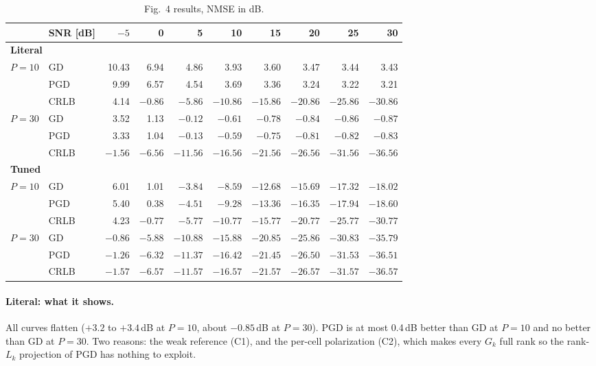 \documentclass[11pt,a4paper]{article}
\begin{document}
\begin{table}[h!]
\centering
\footnotesize
\caption{Fig.~4 results, NMSE in dB.}
\label{tab:fig4res}
\begin{tabular}{llrrrrrrrr}
\toprule
& SNR [dB] & $-5$ & 0 & 5 & 10 & 15 & 20 & 25 & 30 \\
\midrule
\multicolumn{10}{l}{\textbf{Literal}} \\
$P=10$ & GD   & 10.43 & 6.94 & 4.86 & 3.93 & 3.60 & 3.47 & 3.44 & 3.43 \\
       & PGD  & 9.99 & 6.57 & 4.54 & 3.69 & 3.36 & 3.24 & 3.22 & 3.21 \\
       & CRLB & 4.14 & $-0.86$ & $-5.86$ & $-10.86$ & $-15.86$ & $-20.86$ & $-25.86$ & $-30.86$ \\
$P=30$ & GD   & 3.52 & 1.13 & $-0.12$ & $-0.61$ & $-0.78$ & $-0.84$ & $-0.86$ & $-0.87$ \\
       & PGD  & 3.33 & 1.04 & $-0.13$ & $-0.59$ & $-0.75$ & $-0.81$ & $-0.82$ & $-0.83$ \\
       & CRLB & $-1.56$ & $-6.56$ & $-11.56$ & $-16.56$ & $-21.56$ & $-26.56$ & $-31.56$ & $-36.56$ \\
\midrule
\multicolumn{10}{l}{\textbf{Tuned}} \\
$P=10$ & GD   & 6.01 & 1.01 & $-3.84$ & $-8.59$ & $-12.68$ & $-15.69$ & $-17.32$ & $-18.02$ \\
       & PGD  & 5.40 & 0.38 & $-4.51$ & $-9.28$ & $-13.36$ & $-16.35$ & $-17.94$ & $-18.60$ \\
       & CRLB & 4.23 & $-0.77$ & $-5.77$ & $-10.77$ & $-15.77$ & $-20.77$ & $-25.77$ & $-30.77$ \\
$P=30$ & GD   & $-0.86$ & $-5.88$ & $-10.88$ & $-15.88$ & $-20.85$ & $-25.86$ & $-30.83$ & $-35.79$ \\
       & PGD  & $-1.26$ & $-6.32$ & $-11.37$ & $-16.42$ & $-21.45$ & $-26.50$ & $-31.53$ & $-36.51$ \\
       & CRLB & $-1.57$ & $-6.57$ & $-11.57$ & $-16.57$ & $-21.57$ & $-26.57$ & $-31.57$ & $-36.57$ \\
\bottomrule
\end{tabular}
\end{table}

\paragraph{Literal: what it shows.}
All curves flatten ($+3.2$ to $+3.4$\,dB at $P=10$, about $-0.85$\,dB at $P=30$). PGD is at most
0.4\,dB better than GD at $P=10$ and no better than GD at $P=30$. Two reasons: the weak reference (C1), and the per-cell polarization
(C2), which makes every $G_k$ full rank so the rank-$L_k$ projection of PGD has nothing to exploit.
\end{document}
